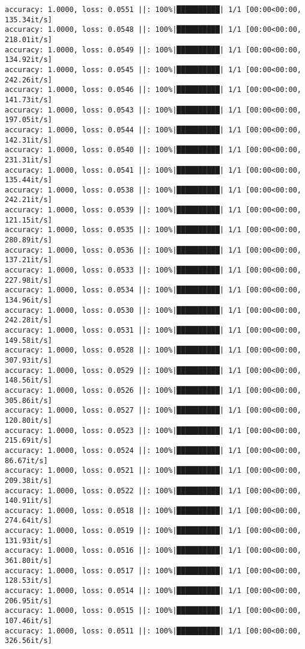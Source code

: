 \documentclass[
]{article}
\begin{document}
\begin{verbatim}
accuracy: 1.0000, loss: 0.0551 ||: 100%|██████████| 1/1 [00:00<00:00, 135.34it/s]
accuracy: 1.0000, loss: 0.0548 ||: 100%|██████████| 1/1 [00:00<00:00, 218.01it/s]
accuracy: 1.0000, loss: 0.0549 ||: 100%|██████████| 1/1 [00:00<00:00, 134.92it/s]
accuracy: 1.0000, loss: 0.0545 ||: 100%|██████████| 1/1 [00:00<00:00, 242.26it/s]
accuracy: 1.0000, loss: 0.0546 ||: 100%|██████████| 1/1 [00:00<00:00, 141.73it/s]
accuracy: 1.0000, loss: 0.0543 ||: 100%|██████████| 1/1 [00:00<00:00, 197.05it/s]
accuracy: 1.0000, loss: 0.0544 ||: 100%|██████████| 1/1 [00:00<00:00, 142.31it/s]
accuracy: 1.0000, loss: 0.0540 ||: 100%|██████████| 1/1 [00:00<00:00, 231.31it/s]
accuracy: 1.0000, loss: 0.0541 ||: 100%|██████████| 1/1 [00:00<00:00, 135.44it/s]
accuracy: 1.0000, loss: 0.0538 ||: 100%|██████████| 1/1 [00:00<00:00, 242.21it/s]
accuracy: 1.0000, loss: 0.0539 ||: 100%|██████████| 1/1 [00:00<00:00, 121.15it/s]
accuracy: 1.0000, loss: 0.0535 ||: 100%|██████████| 1/1 [00:00<00:00, 280.89it/s]
accuracy: 1.0000, loss: 0.0536 ||: 100%|██████████| 1/1 [00:00<00:00, 137.21it/s]
accuracy: 1.0000, loss: 0.0533 ||: 100%|██████████| 1/1 [00:00<00:00, 227.98it/s]
accuracy: 1.0000, loss: 0.0534 ||: 100%|██████████| 1/1 [00:00<00:00, 134.96it/s]
accuracy: 1.0000, loss: 0.0530 ||: 100%|██████████| 1/1 [00:00<00:00, 242.28it/s]
accuracy: 1.0000, loss: 0.0531 ||: 100%|██████████| 1/1 [00:00<00:00, 149.58it/s]
accuracy: 1.0000, loss: 0.0528 ||: 100%|██████████| 1/1 [00:00<00:00, 307.93it/s]
accuracy: 1.0000, loss: 0.0529 ||: 100%|██████████| 1/1 [00:00<00:00, 148.56it/s]
accuracy: 1.0000, loss: 0.0526 ||: 100%|██████████| 1/1 [00:00<00:00, 305.86it/s]
accuracy: 1.0000, loss: 0.0527 ||: 100%|██████████| 1/1 [00:00<00:00, 120.80it/s]
accuracy: 1.0000, loss: 0.0523 ||: 100%|██████████| 1/1 [00:00<00:00, 215.69it/s]
accuracy: 1.0000, loss: 0.0524 ||: 100%|██████████| 1/1 [00:00<00:00, 86.67it/s]
accuracy: 1.0000, loss: 0.0521 ||: 100%|██████████| 1/1 [00:00<00:00, 209.38it/s]
accuracy: 1.0000, loss: 0.0522 ||: 100%|██████████| 1/1 [00:00<00:00, 140.91it/s]
accuracy: 1.0000, loss: 0.0518 ||: 100%|██████████| 1/1 [00:00<00:00, 274.64it/s]
accuracy: 1.0000, loss: 0.0519 ||: 100%|██████████| 1/1 [00:00<00:00, 131.93it/s]
accuracy: 1.0000, loss: 0.0516 ||: 100%|██████████| 1/1 [00:00<00:00, 361.80it/s]
accuracy: 1.0000, loss: 0.0517 ||: 100%|██████████| 1/1 [00:00<00:00, 128.53it/s]
accuracy: 1.0000, loss: 0.0514 ||: 100%|██████████| 1/1 [00:00<00:00, 206.95it/s]
accuracy: 1.0000, loss: 0.0515 ||: 100%|██████████| 1/1 [00:00<00:00, 107.46it/s]
accuracy: 1.0000, loss: 0.0511 ||: 100%|██████████| 1/1 [00:00<00:00, 326.56it/s]

\end{verbatim}
\end{document}
